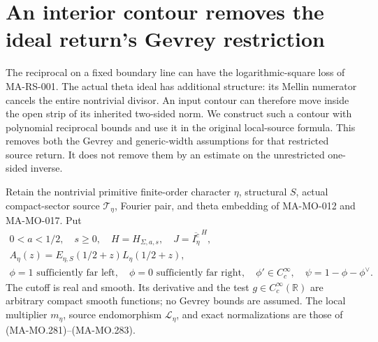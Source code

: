\section{An interior contour removes the ideal return's Gevrey restriction}
\label{sec:interior-contour-source-return}

The reciprocal on a fixed boundary line can have the
logarithmic-square loss of MA-RS-001. The actual theta ideal
has additional structure: its Mellin numerator cancels the
entire nontrivial divisor. An input contour can therefore
move inside the open strip of its inherited two-sided norm.
We construct such a contour with polynomial reciprocal bounds
and use it in the original local-source formula. This
removes both the Gevrey and generic-width assumptions for
that restricted source return. It does not remove them by
an estimate on the unrestricted one-sided inverse.

Retain the nontrivial primitive finite-order character
\(\eta\), structural \(S\), actual compact-sector source
\(\mathcal T_\eta\), Fourier pair, and theta embedding of
MA-MO-012 and MA-MO-017. Put
\[
 \begin{gathered}
 0<a<1/2,\quad s\ge0,\quad
 H=H_{\Sigma,a,s},\quad
 J=\overline{I_\eta^c}^{\,H},\\
 A_\eta(z)=E_{\eta,S}(1/2+z)L_\eta(1/2+z),\\
 \phi=1\text{ sufficiently far left},\quad
 \phi=0\text{ sufficiently far right},\quad
 \phi'\in C_c^\infty,\quad
 \psi=1-\phi-\phi^\vee .
 \end{gathered}
 \tag{MA-MO.800}
\]
The cutoff is real and smooth. Its derivative and the
test \(g\in C_c^\infty(\mathbb R)\) are arbitrary compact
smooth functions; no Gevrey bounds are assumed.
The local multiplier \(m_\eta\), source endomorphism
\(\mathcal L_\eta\), and exact normalizations are those
of (MA-MO.281)--(MA-MO.283).

